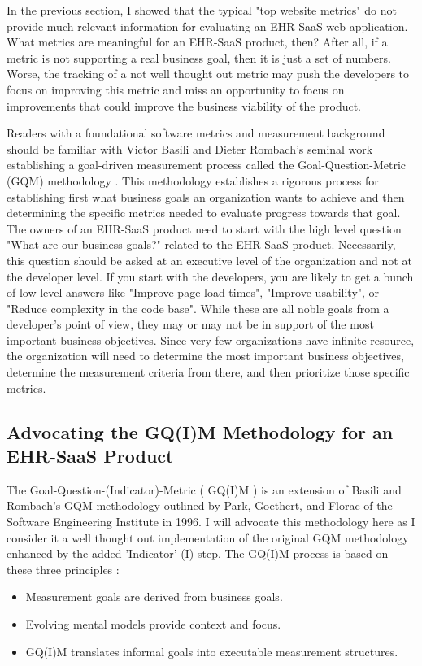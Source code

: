 \documentclass[10pt]{article}
\begin{document}
In the previous section, I showed that the typical "top website metrics" do not provide much relevant information for evaluating an EHR-SaaS web application.
What metrics are meaningful for an EHR-SaaS product, then?
After all, if a metric is not supporting a real business goal, then it is just a set of numbers.
Worse, the tracking of a not well thought out metric may push the developers to focus on improving this metric and miss an opportunity to focus on improvements that could improve the business viability of the product.

Readers with a foundational software metrics and measurement background should be familiar with Victor Basili and Dieter Rombach's seminal work establishing a goal-driven measurement process called the Goal-Question-Metric (GQM) methodology \cite{TODO}.
This methodology establishes a rigorous process for establishing first what business goals an organization wants to achieve and then determining the specific metrics needed to evaluate progress towards that goal.
The owners of an EHR-SaaS product need to start with the high level question "What are our business goals?" related to the EHR-SaaS product.
Necessarily, this question should be asked at an executive level of the organization and not at the developer level.
If you start with the developers, you are likely to get a bunch of low-level answers like "Improve page load times", "Improve usability", or "Reduce complexity in the code base".
While these are all noble goals from a developer's point of view, they may or may not be in support of the most important business objectives.
Since very few organizations have infinite resource, the organization will need to determine the most important business objectives, determine the measurement criteria from there, and then prioritize those specific metrics.



\subsection{Advocating the GQ(I)M Methodology for an EHR-SaaS Product}
\label{sec:EHR-SaaS-GQM-Methodology}

The Goal-Question-(Indicator)-Metric ( GQ(I)M ) is an extension of Basili and Rombach's GQM methodology outlined by Park, Goethert, and Florac of the Software Engineering Institute in 1996.
I will advocate this methodology here as I consider it a well thought out implementation of the original GQM methodology enhanced by the added 'Indicator' (I) step.
The GQ(I)M process is based on these three principles \cite{sei-gqim}:
\begin{itemize}
	\item Measurement goals are derived from business goals.
	\item Evolving mental models provide context and focus.
	\item GQ(I)M translates informal goals into executable measurement structures.
\end{itemize}
\end{document}
